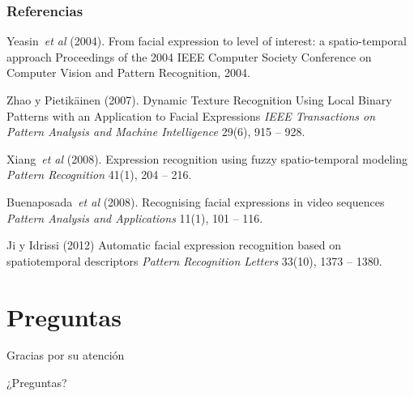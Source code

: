 \documentclass{beamer}
\begin{document}
\begin{frame}
	\frametitle{Referencias}
	\footnotesize{
		\begin{thebibliography}{99} %
			
			 Yeasin~\emph{et al} (2004).
			\newblock From facial expression to level of interest: a spatio-temporal approach
			\newblock Proceedings of the 2004 IEEE Computer Society Conference on Computer Vision and Pattern Recognition, 2004.
			
			 Zhao y Pietikäinen (2007).
			\newblock Dynamic Texture Recognition Using Local Binary Patterns with an Application to Facial Expressions
			\newblock \emph{IEEE Transactions on Pattern Analysis and Machine Intelligence} 29(6), 915 -- 928.
			
			
			 Xiang~\emph{et al} (2008).
			\newblock Expression recognition using fuzzy spatio-temporal modeling
			\newblock \emph{Pattern Recognition} 41(1), 204 -- 216.
			
			 Buenaposada~\emph{et al} (2008).
			\newblock Recognising facial expressions in video sequences
			\newblock \emph{Pattern Analysis and Applications} 11(1), 101 -- 116.
			
			 Ji y Idrissi (2012)
			\newblock Automatic facial expression recognition based on spatiotemporal descriptors
			\newblock \emph{Pattern Recognition Letters} 33(10), 1373 -- 1380.
			
			
		\end{thebibliography}
	}
\end{frame}


\section*{Preguntas}
	\begin{frame}{Gracias por su atención}
		\begin{center}
			¿Preguntas?
		\end{center}
	\end{frame}
\end{document}
